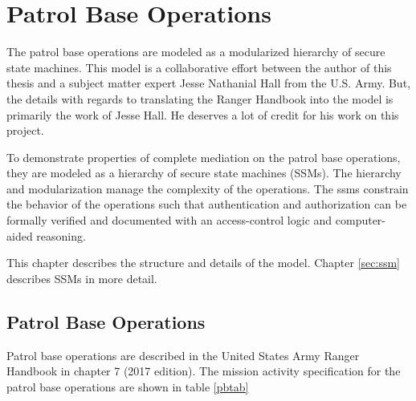 \documentclass[../../main/main.tex]{subfiles}
\begin{document}
\chapter{Patrol Base Operations}\label{chp:pb}
The patrol base operations are modeled as a modularized hierarchy of secure state machines.  This model is a collaborative effort between the author of this thesis and a subject matter expert Jesse Nathanial Hall from the U.S. Army.  But, the details with regards to translating the Ranger Handbook into the model is primarily the work of Jesse Hall.  He deserves a lot of credit for his work on this project.  

To demonstrate properties of complete mediation on the patrol base operations, they are modeled as a hierarchy of secure state machines (SSMs). The hierarchy and modularization manage the complexity of the operations.  The \glspl{ssm} constrain the behavior of the operations such that authentication and authorization can be formally verified and documented with an access-control logic and computer-aided reasoning.

This chapter describes the structure and details of the model.  Chapter  \ref{sec:ssm} describes SSMs in more detail.

\section{Patrol Base Operations}
Patrol base operations are described in the United States Army Ranger Handbook \cite{rangermanual} in chapter 7 (2017 edition).  The mission activity specification for the patrol base operations are shown in table \ref{pbtab}
\end{document}
